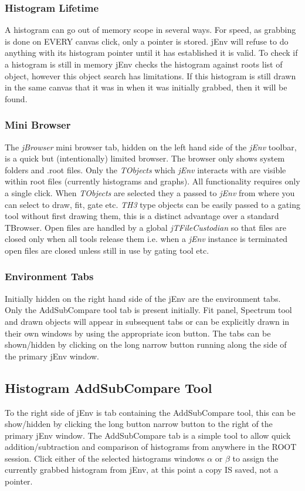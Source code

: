 \documentclass[a4paper,10pt]{article}
\begin{document}
\subsubsection{Histogram Lifetime}
A histogram can go out of memory scope in several ways. For speed, as grabbing is done on EVERY canvas click, only a pointer is stored. jEnv will refuse to do anything with its histogram pointer until it has established it is valid. To check if a histogram is still in memory jEnv checks the histogram against roots list of object, however this object search has limitations. If this histogram is still drawn in the same canvas that it was in when it was initially grabbed, then it will be found.

\subsubsection{Mini Browser}

The \textit{jBrowser} mini browser tab, hidden on the left hand side of the \textit{jEnv} toolbar, is a quick but (intentionally) limited browser.
The browser only shows system folders and .root files.
Only the \textit{TObjects} which \textit{jEnv} interacts with are visible within root files (currently histograms and graphs).
All functionality requires only a single click.
When \textit{TObjects} are selected they a passed to \textit{jEnv} from where you can select to draw, fit, gate etc.
 \textit{TH3} type objects can be easily passed to a gating tool without first drawing them, this is a distinct advantage over a standard TBrowser.
 Open files are handled by a global \textit{jTFileCustodian} so that files are closed only when all tools release them i.e. when a \textit{jEnv} instance is terminated open files are closed unless still in use by gating tool etc. 

\subsubsection{Environment Tabs}
Initially hidden on the right hand side of the jEnv are the environment tabs. Only the AddSubCompare tool tab is present initially. Fit panel, Spectrum tool and drawn objects will appear in subsequent tabs or can be explicitly drawn in their own windows by using the appropriate icon button.
The tabs can be shown/hidden by clicking on the long narrow button running along the side of the primary jEnv window.

\subsection{Histogram AddSubCompare Tool}
To the right side of jEnv is tab containing the AddSubCompare tool, this can be show/hidden by clicking the long button narrow button to the right of the primary jEnv window. The AddSubCompare tab is a simple tool to allow quick addition/subtraction and comparison of histograms from anywhere in the ROOT session.
Click either of the selected histograms windows $\alpha$ or $\beta$ to assign the currently grabbed histogram from jEnv, at this point a copy IS saved, not a pointer.
\end{document}
